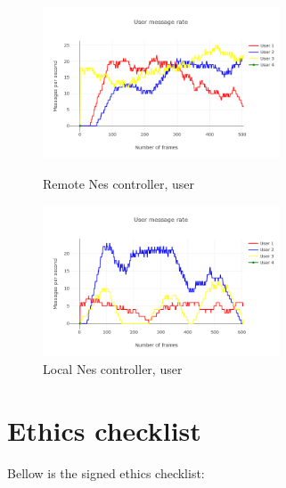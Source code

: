 \documentclass{l4proj}
\begin{document}
\begin{appendices}
\begin{figure}[h!]
    \centering
    \begin{minipage}{0.45\textwidth}
        \centering
        \includegraphics[width=7cm]{./images/rnessuser.png} %
        \caption{Remote Nes controller, user}
        \label{rnesuser}
    \end{minipage}\hfill
    \begin{minipage}{0.45\textwidth}
        \centering
        \includegraphics[width=7cm]{./images/lnessuser.png} %
        \caption{Local Nes controller, user}
        \label{lnesuser}
    \end{minipage}
\end{figure}

\pagebreak
\section{Ethics checklist}
Bellow is the signed ethics checklist: 


\end{appendices}
\end{document}
